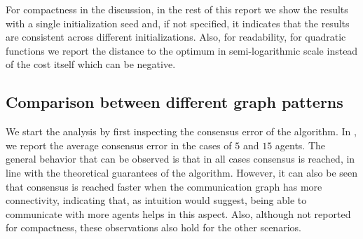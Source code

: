 \documentclass[a4paper,11pt,oneside]{book}
\begin{document}
For compactness in the discussion, in the rest of this report we show the results with a single initialization seed and, if not specified, it indicates that the results are consistent across different initializations. Also, for readability, for quadratic functions we report the distance to the optimum in semi-logarithmic scale instead of the cost itself which can be negative.


\subsection{Comparison between different graph patterns}

We start the analysis by first inspecting the consensus error of the algorithm. In , we report the average consensus error in the cases of $5$ and $15$ agents. The general behavior that can be observed is that in all cases consensus is reached, in line with the theoretical guarantees of the algorithm. However, it can also be seen that consensus is reached faster when the communication graph has more connectivity, indicating that, as intuition would suggest, being able to communicate with more agents helps in this aspect. Also, although not reported for compactness, these observations also hold for the other scenarios.
\end{document}
